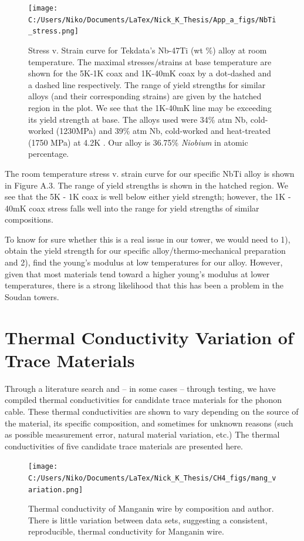 \documentclass{report}
\begin{document}
\begin{appendices}
\begin{figure}[h]
\centering
\texttt{[image: C:/Users/Niko/Documents/LaTex/Nick\_K\_Thesis/App\_a\_figs/NbTi\_stress.png]}
\caption{Stress v. Strain curve for Tekdata's Nb-47Ti (wt \%) alloy at room temperature. The maximal stresses/strains at base temperature are shown for the 5K-1K coax and 1K-40mK coax by a dot-dashed and a dashed line respectively. The range of yield strengths for similar alloys (and their corresponding strains) are given by the hatched region in the plot.  We see that the 1K-40mK line may be exceeding its yield strength at base. The alloys used were 34\% atm Nb, cold-worked (1230MPa) and 39\% atm Nb, cold-worked and heat-treated (1750 MPa) at 4.2K \cite{Collings1986}. Our alloy is 36.75\% \emph{Niobium} in atomic percentage.}
\end{figure}

The room temperature stress v. strain curve for our specific NbTi alloy is shown in Figure A.3. The range of yield strengths is shown in the hatched region. We see that the 5K - 1K coax is well below either yield strength; however, the 1K - 40mK coax stress falls well into the range for yield strengths of similar compositions.

To know for sure whether this is a real issue in our tower, we would need to 1), obtain the yield strength for our specific alloy/thermo-mechanical preparation and 2), find the young's modulus at low temperatures for our alloy. However, given that most materials tend toward a higher young's modulus at lower temperatures, there is a strong likelihood that this has been a problem in the Soudan towers.


\chapter{Thermal Conductivity Variation of Trace Materials}

Through a literature search and -- in some cases -- through testing, we have compiled thermal conductivities for candidate trace materials for the phonon cable. These thermal conductivities are shown to vary depending on the source of the material, its specific composition, and sometimes for unknown reasons (such as possible measurement error, natural material variation, etc.) The thermal conductivities of five candidate trace materials are presented here.
 
\begin{figure}[h]
\centering
\texttt{[image: C:/Users/Niko/Documents/LaTex/Nick\_K\_Thesis/CH4\_figs/mang\_variation.png]}
\caption{Thermal conductivity of Manganin wire by composition and author. There is little variation between data sets, suggesting a consistent, reproducible, thermal conductivity for Manganin wire.}
\end{figure}


\end{appendices}
\end{document}

